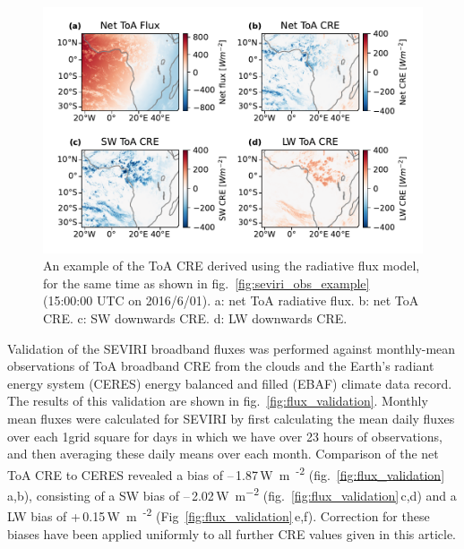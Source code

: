 \documentclass[acp, manuscript]{copernicus}
\begin{document}
\begin{figure}[tp]
    \includegraphics[width=12cm]{figures/fig02.pdf}
    \caption[
    An example of the ToA CRE derived using the radiative flux model
    ]{
    An example of the ToA CRE derived using the radiative flux model, for the same time
    as shown in fig.~\ref{fig:seviri_obs_example} (15:00:00 UTC on 2016/6/01). a: net ToA radiative flux. b: net ToA CRE. c: SW downwards CRE. d: LW downwards CRE.
    }
    \label{fig:seviri_flux_example}
\end{figure}


Validation of the SEVIRI broadband fluxes was performed against monthly-mean observations of ToA broadband CRE from the clouds and the Earth's radiant energy system (CERES) \citep{loeb_clouds_2018} energy balanced and filled (EBAF) climate data record. 
The results of this validation are shown in fig.~\ref{fig:flux_validation}. 
Monthly mean fluxes were calculated for SEVIRI by first calculating the mean daily fluxes over each 1\textdegree grid square for days in which we have over 23 hours of observations, and then averaging these daily means over each month. 
Comparison of the net ToA CRE to CERES revealed a bias of --\,1.87\,\unit{W m\textsuperscript{-2}} (fig.~\ref{fig:flux_validation}\,a,b), consisting of a SW bias of --\,2.02\,\unit{W m^{-2}} (fig.~\ref{fig:flux_validation}\,c,d) and a LW bias of +\,0.15\,\unit{W m\textsuperscript{-2}} (Fig~\ref{fig:flux_validation}\,e,f). 
Correction for these biases have been applied uniformly to all further CRE values given in this article.
\end{document}
